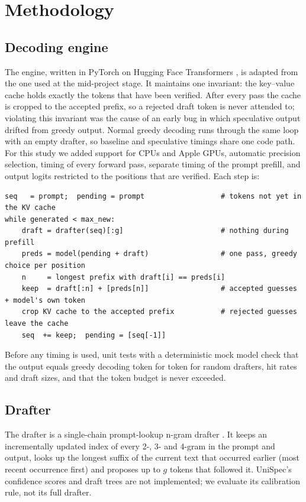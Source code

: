 \documentclass[11pt,a4paper]{article}
\begin{document}
\section{Methodology}
\subsection{Decoding engine}
The engine, written in PyTorch \cite{pytorch} on Hugging Face Transformers \cite{transformers}, is adapted from the one used at the mid-project stage. It maintains one invariant: the key--value cache holds exactly the tokens that have been verified. After every pass the cache is cropped to the accepted prefix, so a rejected draft token is never attended to; violating this invariant was the cause of an early bug in which speculative output drifted from greedy output. Normal greedy decoding runs through the same loop with an empty drafter, so baseline and speculative timings share one code path. For this study we added support for CPUs and Apple GPUs, automatic precision selection, timing of every forward pass, separate timing of the prompt prefill, and output logits restricted to the positions that are verified. Each step is:

\begin{lstlisting}
seq   = prompt;  pending = prompt                  # tokens not yet in the KV cache
while generated < max_new:
    draft = drafter(seq)[:g]                       # nothing during prefill
    preds = model(pending + draft)                 # one pass, greedy choice per position
    n     = longest prefix with draft[i] == preds[i]
    keep  = draft[:n] + [preds[n]]                 # accepted guesses + model's own token
    crop KV cache to the accepted prefix           # rejected guesses leave the cache
    seq  += keep;  pending = [seq[-1]]
\end{lstlisting}
Before any timing is used, unit tests with a deterministic mock model check that the output equals greedy decoding token for token for random drafters, hit rates and draft sizes, and that the token budget is never exceeded.

\subsection{Drafter}
The drafter is a single-chain prompt-lookup n-gram drafter \cite{pld}. It keeps an incrementally updated index of every 2-, 3- and 4-gram in the prompt and output, looks up the longest suffix of the current text that occurred earlier (most recent occurrence first) and proposes up to $g$ tokens that followed it. UniSpec's confidence scores and draft trees are not implemented; we evaluate its calibration rule, not its full drafter.
\end{document}
